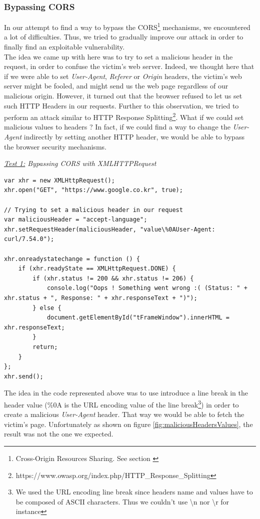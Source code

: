 \documentclass[journal]{IEEEtran}
\begin{document}
\subsubsection*{Bypassing CORS} 

In our attempt to find a way to bypass the CORS\footnote{Cross-Origin Resources Sharing. See section \label{CORSSection}} mechanisms, we encountered a lot of difficulties. Thus, we tried to gradually improve our attack in order to finally find an exploitable vulnerability. \\
The idea we came up with here was to try to set a malicious header in the request, in order to confuse the victim's web server. Indeed, we thought here that if we were able to set \emph{User-Agent}, \emph{Referer} or \emph{Origin} headers, the victim's web server might be fooled, and might send us the web page regardless of our malicious origin. However, it turned out that the browser refused to let us set such HTTP Headers in our requests. Further to this observation, we tried to perform an attack similar to HTTP Response Splitting\footnote{https://www.owasp.org/index.php/HTTP\_Response\_Splitting}. What if we could set malicious values to headers ? In fact, if we could find a way to change the \emph{User-Agent} indirectly by setting another HTTP header, we would be able to bypass the browser security mechanisms.

\medskip

\emph{\underline{Test 1:} Bypassing CORS with XMLHTTPRequest} \\
\begin{lstlisting}[caption=Trying to set malicious headers with XMLHTTPRequest]
var xhr = new XMLHttpRequest();
xhr.open("GET", "https://www.google.co.kr", true);
      
// Trying to set a malicious header in our request
var maliciousHeader = "accept-language";
xhr.setRequestHeader(maliciousHeader, "value\%0AUser-Agent: curl/7.54.0");
      
xhr.onreadystatechange = function () {
    if (xhr.readyState == XMLHttpRequest.DONE) {
        if (xhr.status != 200 && xhr.status != 206) {
            console.log("Oops ! Something went wrong :( (Status: " + xhr.status + ", Response: " + xhr.responseText + ")");
        } else {
            document.getElementById("tFrameWindow").innerHTML = xhr.responseText;
        }
        return;
    }
};
xhr.send();
\end{lstlisting}

The idea in the code represented above was to use introduce a line break in the header value (\%0A is the URL encoding value of the line break\footnote{We used the URL encoding line break since headers name and values have to be composed of ASCII characters. Thus we couldn't use \textbackslash n nor \textbackslash r for instance}) in order to create a malicious \emph{User-Agent} header. That way we would be able to fetch the victim's page. Unfortunately as shown on figure \ref{fig:maliciousHeadersValues}, the result was not the one we expected.
\end{document}
